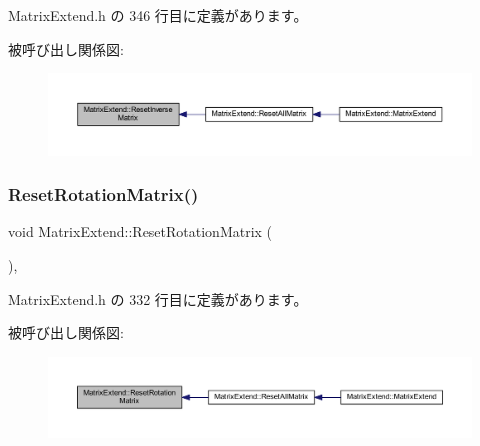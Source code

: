  Matrix\+Extend.\+h の 346 行目に定義があります。

被呼び出し関係図\+:\nopagebreak
\begin{figure}[H]
\begin{center}
\leavevmode
\includegraphics[width=350pt]{class_matrix_extend_a14f5cf7ced273e96c238cc416d0719ac_icgraph}
\end{center}
\end{figure}
\mbox{\label{class_matrix_extend_a52ebf23df3851d1225faf7211595811f}} 
\subsubsection{\texorpdfstring{Reset\+Rotation\+Matrix()}{ResetRotationMatrix()}}
{\footnotesize\ttfamily void Matrix\+Extend\+::\+Reset\+Rotation\+Matrix (\begin{DoxyParamCaption}{ }\end{DoxyParamCaption})\hspace{0.3cm}{\ttfamily [inline]}, {\ttfamily [private]}}



 Matrix\+Extend.\+h の 332 行目に定義があります。

被呼び出し関係図\+:\nopagebreak
\begin{figure}[H]
\begin{center}
\leavevmode
\includegraphics[width=350pt]{class_matrix_extend_a52ebf23df3851d1225faf7211595811f_icgraph}
\end{center}
\end{figure}
\mbox{\label{class_matrix_extend_a1932807f81cebd1d4d101ad4be13e55d}} 
